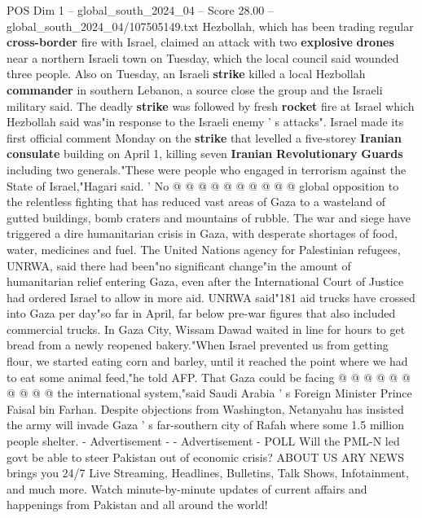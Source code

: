 \begin{textsample}{POS Dim 1 – global\_south\_2024\_04 – Score 28.00 – global\_south\_2024\_04/107505149.txt}
Hezbollah, which has been trading regular \textbf{cross-border} fire with Israel, claimed an attack with two \textbf{explosive} \textbf{drones} near a northern Israeli town on Tuesday, which the local council said wounded three people.
Also on Tuesday, an Israeli \textbf{strike} killed a local Hezbollah \textbf{commander} in southern Lebanon, a source close the group and the Israeli military said.
The deadly \textbf{strike} was followed by fresh \textbf{rocket} fire at Israel which Hezbollah said was"in response to the Israeli enemy ' s attacks".
Israel made its first official comment Monday on the \textbf{strike} that levelled a five-storey \textbf{Iranian} \textbf{consulate} building on April 1, killing seven \textbf{Iranian} \textbf{Revolutionary} \textbf{Guards} including two generals."These were people who engaged in terrorism against the State of Israel,"Hagari said. ' No @ @ @ @ @ @ @ @ @ @ global opposition to the relentless fighting that has reduced vast areas of Gaza to a wasteland of gutted buildings, bomb craters and mountains of rubble.
The war and siege have triggered a dire humanitarian crisis in Gaza, with desperate shortages of food, water, medicines and fuel.
The United Nations agency for Palestinian refugees, UNRWA, said there had been"no significant change"in the amount of humanitarian relief entering Gaza, even after the International Court of Justice had ordered Israel to allow in more aid.
UNRWA said"181 aid trucks have crossed into Gaza per day"so far in April, far below pre-war figures that also included commercial trucks.
In Gaza City, Wissam Dawad waited in line for hours to get bread from a newly reopened bakery."When Israel prevented us from getting flour, we started eating corn and barley, until it reached the point where we had to eat some animal feed,"he told AFP.
That Gaza could be facing @ @ @ @ @ @ @ @ @ @ the international system,"said Saudi Arabia ' s Foreign Minister Prince Faisal bin Farhan.
Despite objections from Washington, Netanyahu has insisted the army will invade Gaza ' s far-southern city of Rafah where some 1.5 million people shelter. - Advertisement - - Advertisement - POLL Will the PML-N led govt be able to steer Pakistan out of economic crisis?
ABOUT US ARY NEWS brings you 24/7 Live Streaming, Headlines, Bulletins, Talk Shows, Infotainment, and much more.
Watch minute-by-minute updates of current affairs and happenings from Pakistan and all around the world!

\end{textsample}
